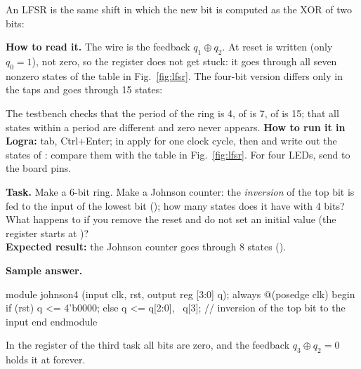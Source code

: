 An LFSR is the same shift in which the new bit is computed as the XOR of two
bits:


\textbf{How to read it.} The wire  is the feedback $q_1\oplus q_2$. At
reset  is written (only $q_0=1$), not zero, so the register does not
get stuck: it goes through all seven nonzero states of the table in
Fig.~\ref{fig:lfsr}. The four-bit version differs only in the taps and goes
through 15 states:


The testbench  checks that the period of the ring is 4,
of  is 7, of  is 15; that all states within a period
are different and zero never appears. \textbf{How to run it in Logra:}
 tab, Ctrl+Enter; in  apply  for one clock
cycle, then  and write out the states of : compare them with
the table in Fig.~\ref{fig:lfsr}. For four LEDs, send  to the board pins.

\begin{diybox}
\textbf{Task.}  Make a 6-bit ring.  Make a Johnson counter:
the \emph{inversion} of the top bit is fed to the input of the lowest bit
(); how many states does it have with 4
bits?  What happens to  if you remove the reset and do not
set an initial value (the register starts at )?\\
\textbf{Expected result:} the Johnson counter goes through 8 states
().
\end{diybox}

\textbf{Sample answer.}
\begin{vcode}
module johnson4 (input clk, rst, output reg [3:0] q);
    always @(posedge clk) begin
        if (rst) q <= 4'b0000;
        else     q <= {q[2:0], ~q[3]};   // inversion of the top bit to the input
    end
endmodule
\end{vcode}
In the register of the third task all bits are zero, and the feedback
$q_3\oplus q_2=0$ holds it at  forever.


